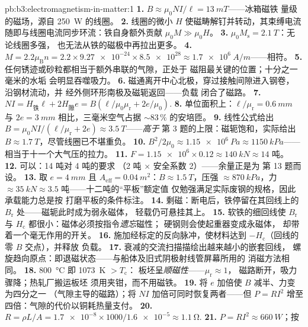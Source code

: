 \begin{solution}{pb:b3:electromagnetism-in-matter:1}
\textbf{1.} $B \approx \mu_0NI/\ell = \qty{13}{mT}$——冰箱磁铁
量级的磁场，源自 \qty{250}{W} 的线圈。
\textbf{2.} 线圈的微小 $H$ 使磁畴解钉并转动，其束缚电流
随即与线圈电流同步环流：铁自身额外贡献
$\mu_0M \gg \mu_0H$。
\textbf{3.} $\mu_0M_{\text{s}} = \qty{2.1}{T}$：无论线圈多强，
也无法从铁的磁极中再拉出更多。
\textbf{4.} $M = 2.2\mu_{\text{B}}n = 2.2\times\num{9.27e-24}
\times\num{8.5e28} \approx \qty{1.7e6}{A/m}$——相符。
\textbf{5.} 任何锈迹或砂粒都相当于额外串联的气隙，正处于
磁阻最关键的位置；十分之一毫米的水垢
会明显吞噬吸力。
\textbf{6.} 磁通离开中心北极，穿过接触间隙进入钢卷，
沿钢材流动，并
经外侧环形南极及磁轭返回——负载
闭合了磁路。
\textbf{7.} $NI = H_{\text{铁}}\ell + 2H_{\text{隙}}e =
B(\ell/\mu_0\mu_{\text{r}} + 2e/\mu_0)$.
\textbf{8.} 单位面积上：$\ell/\mu_{\text{r}} = \qty{0.6}{mm}$
与 $2e = \qty{3}{mm}$ 相比，三毫米空气占据
$\sim83\,\%$ 的安培匝。
\textbf{9.} 线性公式给出 $B = \mu_0NI/(\ell/
\mu_{\text{r}} + 2e) \approx \qty{3.5}{T}$——\emph{高于}
第 3 题的上限：磁轭饱和，实际给出 $B \approx
\qty{1.7}{T}$，尽管线圈已不堪重负。
\textbf{10.} $B^2/2\mu_0 \approx \qty{1.15e6}{Pa} \approx
\qty{1150}{kPa}$——相当于十一个大气压的拉力。
\textbf{11.} $F = \num{1.15e6}\times0.12 \approx \qty{140}{kN}
\approx 14$ 吨。
\textbf{12.} 可以：14 吨对 4 吨的要求
（2 吨 $\times$ 安全系数 2）——余量正是为
第 13 题而设。
\textbf{13.} 取 $e = \qty{4}{mm}$ 且 $A_{\text{eff}} =
\qty{0.04}{m^2}$：$B \approx \qty{1.5}{T}$，压强
$\approx\qty{870}{kPa}$，力 $\approx\qty{35}{kN} \approx 3.5$
吨——十二吨的“平板”额定值
仅勉强满足实际废钢的规格，因此承载能力总是按
打磨平板的条件标注。
\textbf{14.} 剩磁：断电后，铁停留在其回线上的
$B_{\text{r}}$ 处——磁轭此时成为弱永磁体，
轻载仍可悬挂其上。
\textbf{15.} 软铁的细回线使 $B_{\text{r}}$ 与
$H_{\text{c}}$ 都很小：磁体必须按指令\emph{遗忘}磁性；
硬钢则会使起重器变成永磁体，
却带着一个毫无作用的开关。
\textbf{16.} 施加经标定的反向脉冲，使材料达到
$-H_{\text{c}}$（回线的零 $B$ 交点），并释放
负载。
\textbf{17.} 衰减的交流扫描描绘出越来越小的嵌套回线，
螺旋趋向原点：即退磁状态——与船体及旧式阴极射线管屏幕所用的
消磁方法相同。
\textbf{18.} \qty{800}{\celsius} 即 \qty{1073}{K} $> T_{\text{c}}$：
板坯呈\emph{顺磁性}——$\mu_{\text{r}} \approx 1$，
磁路断开，吸力骤降；热轧厂搬运板坯
须用夹钳，而不用磁铁。
\textbf{19.} 将 $e$ 加倍使 $B$ 减半、力变为四分之一
（气隙主导的磁路）；将 $NI$ 加倍可同时恢复两者——但
$P = RI^2$ 增至四倍：气隙的代价以铜耗热量支付。
\textbf{20.} $R = \rho L/A = \num{1.7e-8}\times1000/
\num{1.6e-5} \approx \qty{1.1}{\ohm}$.
\textbf{21.} $P = RI^2 \approx \qty{660}{W}$；按

\end{solution}
